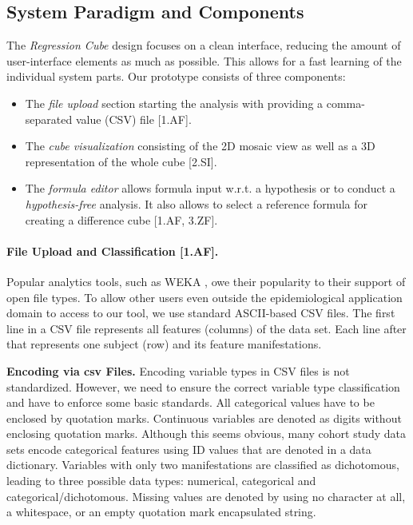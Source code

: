 \documentclass[journal]{style/vgtc} 			          %
\newcommand{\com}[1]{\textcolor{orange}{\uline{#1}}}
\begin{document}
\subsection{System Paradigm and Components}
The \emph{Regression Cube} design focuses on a clean interface, reducing the amount of user-interface elements as much as possible.
This allows for a fast learning of the individual system parts.
Our prototype consists of three components:
\begin{itemize}
	\item The \emph{file upload} section starting the analysis with providing a comma-separated value (CSV) file [1.AF].
	\item The \emph{cube visualization} consisting of the 2D mosaic view as well as a 3D representation of the whole cube [2.SI].
	\item The \emph{formula editor} allows formula input w.r.t. a hypothesis or to conduct a \emph{hypothesis-free} analysis.
	It also allows to select a reference formula for creating a difference cube [1.AF, 3.ZF].
\end{itemize}
\paragraph{File Upload and Classification [1.AF].}
Popular analytics tools, such as WEKA \cite{WEKA}, owe their popularity to their support of open file types.
To allow other users even outside the epidemiological application domain to access to our tool, we use standard ASCII-based CSV files.
The first line in a CSV file represents all features (columns) of the data set.
Each line after that represents one subject (row) and its feature manifestations.

\textbf{Encoding via csv Files.}
Encoding variable types in CSV files is not standardized.
However, we need to ensure the correct variable type classification and have to enforce some basic standards.
All categorical values have to be enclosed by quotation marks.
Continuous variables are denoted as digits without enclosing quotation marks.
Although this seems obvious, many cohort study data sets encode categorical features using ID values that are denoted in a data dictionary.
Variables with only two manifestations are classified as dichotomous, leading to three possible data types: numerical, categorical and categorical/dichotomous.
Missing values are denoted by using no character at all, a whitespace, or an empty quotation mark encapsulated string.
\end{document}
